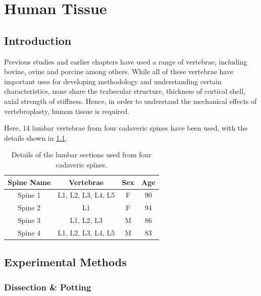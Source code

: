 \chapter{Human Tissue} \label{Chapter_HT}

\section{Introduction}

Previous studies and earlier chapters have used a range of vertebrae, including
bovine, ovine and porcine among others. While all of these vertebrae have
important uses for developing methodology and understanding certain
characteristics, none share the trabecular structure, thickness of cortical
shell, axial strength of stiffness. Hence, in order to understand the
mechanical effects of vertebroplasty, human tissue is required.

Here, 14 lumbar vertebrae from four cadaveric spines have been used, with the
details shown in \cref{tab:vertebrae}.

\begin{table}[ht!]
\centering
  \caption{Details of the lumbar sections used from four cadaveric spines.}
  \label{tab:vertebrae}
  \begin{tabular}{c|c|c|c}
    Spine Name & Vertebrae & Sex & Age \\ \hline \hline
    Spine 1& L1, L2, L3, L4, L5 & F & 90\\ \hline
    Spine 2& L1 & F & 94\\ \hline
    Spine 3& L1, L2, L3 & M & 86\\ \hline
    Spine 4& L1, L2, L3, L4, L5 & M & 83\\ \hline

  \end{tabular}

\end{table}


\section{Experimental Methods}

\subsection{Dissection \& Potting}

